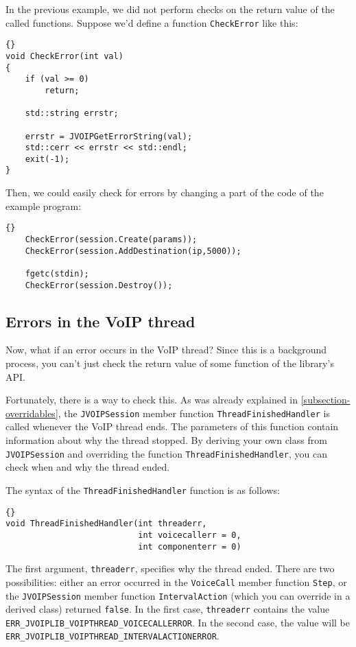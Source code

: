 		In the previous example, we did not perform checks on the return value
		of the called functions. Suppose we'd define a function {\tt CheckError}
		like this:
		\begin{lstlisting}[frame=tb]{}
void CheckError(int val)
{
	if (val >= 0)
		return;
		
	std::string errstr;
	
	errstr = JVOIPGetErrorString(val);
	std::cerr << errstr << std::endl;
	exit(-1);
}
		\end{lstlisting}
		
		Then, we could easily check for errors by changing a part of the code
		of the example program:
		\begin{lstlisting}[frame=tb]{}
	CheckError(session.Create(params));
	CheckError(session.AddDestination(ip,5000));
	
	fgetc(stdin);
	CheckError(session.Destroy());
		\end{lstlisting}
		
		\subsection{Errors in the VoIP thread}
		
		Now, what if an error occurs in the VoIP thread? Since this is a background
		process, you can't just check the return value of some function of the 
		library's API.
		
		Fortunately, there is a way to check this. As was already explained in 
		\ref{subsection-overridables}, the {\tt JVOIPSession} member function
		{\tt Thread\-Finished\-Handler} is called whenever the VoIP thread ends.
		The parameters of this function contain information about why the thread
		stopped. By deriving your own class from {\tt JVOIP\-Session} and overriding
		the function {\tt Thread\-Finished\-Handler}, you can check when and why the
		thread ended.
		
		The syntax of the {\tt ThreadFinishedHandler} function is as follows:
		\begin{lstlisting}[frame=tb]{}
void ThreadFinishedHandler(int threaderr,
                           int voicecallerr = 0,
                           int componenterr = 0)
		\end{lstlisting}
		
		The first argument, {\tt threaderr}, specifies why the thread ended.
		There are two possibilities: either an error occurred in the {\tt Voice\-Call}
		member function {\tt Step}, or the {\tt JVOIPSession} member function
		{\tt IntervalAction} (which you can override in a derived class) returned
		{\tt false}. In the first case, {\tt threaderr} contains the value 
		{\tt ERR\_\-JVOIP\-LIB\_\-VOIP\-THREAD\_\-VOICE\-CALL\-ERROR}. In the second
		case, the value will be {\tt ERR\_\-JVOIP\-LIB\_\-VOIP\-THREAD\_\-INTER\-VAL\-ACTION\-ERROR}.
		
